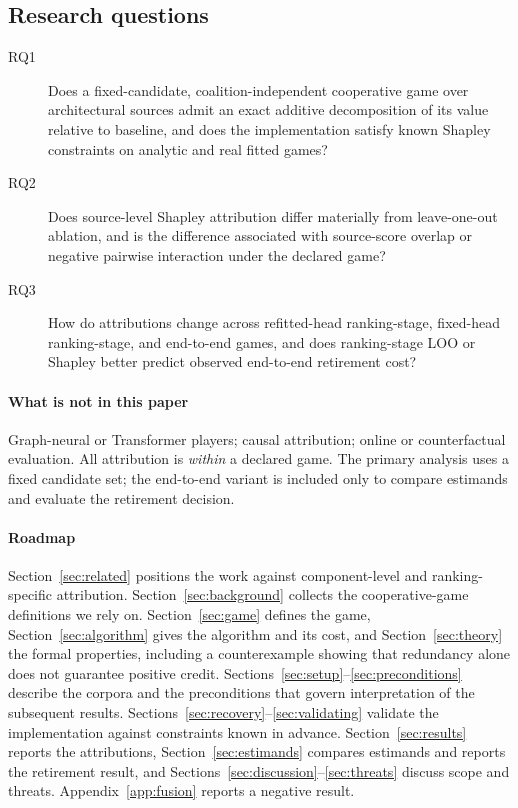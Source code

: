 \documentclass[pdflatex,sn-basic,Numbered]{sn-jnl}
\theoremstyle{plain}
\theoremstyle{definition}
\begin{document}
\subsection{Research questions}

\begin{description}
\item[RQ1] Does a fixed-candidate, coalition-independent cooperative game over
  architectural sources admit an exact additive decomposition of its value
  relative to baseline, and does the implementation satisfy known Shapley
  constraints on analytic and real fitted games?
\item[RQ2] Does source-level Shapley attribution differ materially from
  leave-one-out ablation, and is the difference associated with source-score
  overlap or negative pairwise interaction under the declared game?
\item[RQ3] How do attributions change across refitted-head ranking-stage,
  fixed-head ranking-stage, and end-to-end games, and does ranking-stage LOO or
  Shapley better predict observed end-to-end retirement cost?
\end{description}

\paragraph{What is not in this paper} Graph-neural or Transformer players;
causal attribution; online or counterfactual evaluation. All attribution is
\emph{within} a declared game. The primary analysis uses a fixed candidate set;
the end-to-end variant is included only to compare estimands and evaluate the
retirement decision.

\paragraph{Roadmap} Section~\ref{sec:related} positions the work against
component-level and ranking-specific attribution. Section~\ref{sec:background}
collects the cooperative-game definitions we rely on. Section~\ref{sec:game}
defines the game, Section~\ref{sec:algorithm} gives the algorithm and its cost,
and Section~\ref{sec:theory} the formal properties, including a counterexample
showing that redundancy alone does not guarantee positive credit.
Sections~\ref{sec:setup}--\ref{sec:preconditions} describe the corpora and the
preconditions that govern interpretation of the subsequent results.
Sections~\ref{sec:recovery}--\ref{sec:validating} validate the implementation
against constraints known in advance. Section~\ref{sec:results} reports the
attributions, Section~\ref{sec:estimands} compares estimands and reports the
retirement result, and Sections~\ref{sec:discussion}--\ref{sec:threats}
discuss scope and threats. Appendix~\ref{app:fusion} reports a negative
result.
\end{document}
